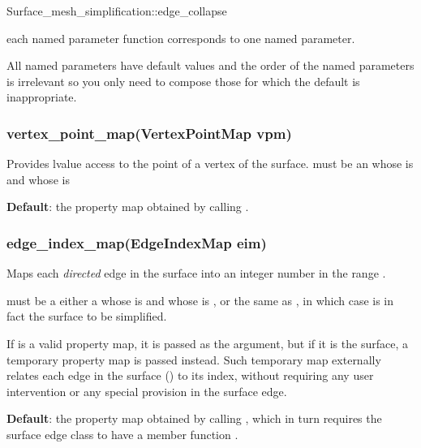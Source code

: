 \begin{ccRefFunction}{Surface_mesh_simplification::edge_collapse}

each named parameter function corresponds to one named parameter.

All named parameters have default values and the order of the named parameters 
is irrelevant so you only need to compose those for which the default
is inappropriate.

\subsubsection*{vertex\_point\_map(VertexPointMap vpm)}

Provides lvalue access to the point of a vertex of the surface.
 must be an 
whose  is
and whose  is 

\textbf{Default}: the property map obtained by calling .



\subsubsection*{edge\_index\_map(EdgeIndexMap eim)} 

Maps each {\em directed} edge in the surface into an integer number
in the range \ccc{[0,num_edge(surface))}.

 must be a either a
whose  is
and whose  is 
,
or the same as , in which case 
 is in fact the surface to be simplified.

If  is a valid property map, it is
passed as the argument, but if it is the surface, a
temporary property map is passed instead.
Such temporary map externally relates each edge 
in the surface () to its index,
without requiring any user intervention or any special
provision in the surface edge.

\textbf{Default}: the property map obtained by calling , which 
in turn requires the surface edge class to have a member function 
.




\end{ccRefFunction}
